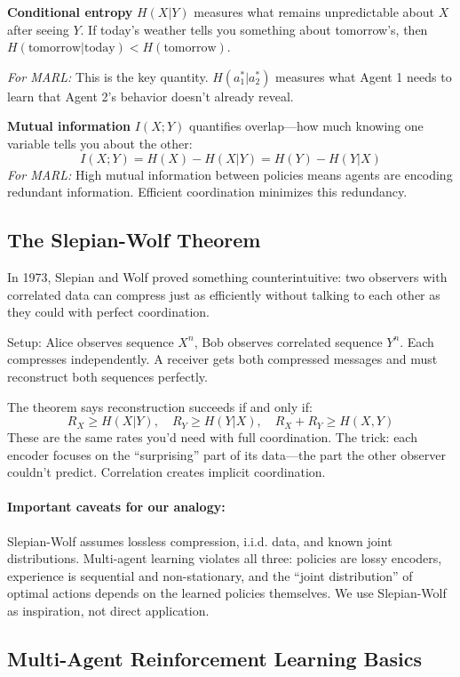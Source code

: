 \documentclass[10pt, letterpaper]{article}
\begin{document}
\textbf{Conditional entropy} $H(X|Y)$ measures what remains unpredictable about $X$ after seeing $Y$. If today's weather tells you something about tomorrow's, then $H(\text{tomorrow}|\text{today}) < H(\text{tomorrow})$.

\emph{For MARL:} This is the key quantity. $H(a_1^*|a_2^*)$ measures what Agent 1 needs to learn that Agent 2's behavior doesn't already reveal.

\textbf{Mutual information} $I(X;Y)$ quantifies overlap---how much knowing one variable tells you about the other:
\[I(X;Y) = H(X) - H(X|Y) = H(Y) - H(Y|X)\]
\emph{For MARL:} High mutual information between policies means agents are encoding redundant information. Efficient coordination minimizes this redundancy.

\subsection{The Slepian-Wolf Theorem}

In 1973, Slepian and Wolf proved something counterintuitive: two observers with correlated data can compress just as efficiently without talking to each other as they could with perfect coordination.

Setup: Alice observes sequence $X^n$, Bob observes correlated sequence $Y^n$. Each compresses independently. A receiver gets both compressed messages and must reconstruct both sequences perfectly.

The theorem says reconstruction succeeds if and only if:
\[R_X \geq H(X|Y), \quad R_Y \geq H(Y|X), \quad R_X + R_Y \geq H(X,Y)\]
These are the same rates you'd need with full coordination. The trick: each encoder focuses on the ``surprising'' part of its data---the part the other observer couldn't predict. Correlation creates implicit coordination.

\paragraph{Important caveats for our analogy:} Slepian-Wolf assumes lossless compression, i.i.d. data, and known joint distributions. Multi-agent learning violates all three: policies are lossy encoders, experience is sequential and non-stationary, and the ``joint distribution'' of optimal actions depends on the learned policies themselves. We use Slepian-Wolf as inspiration, not direct application.

\subsection{Multi-Agent Reinforcement Learning Basics}
\end{document}
